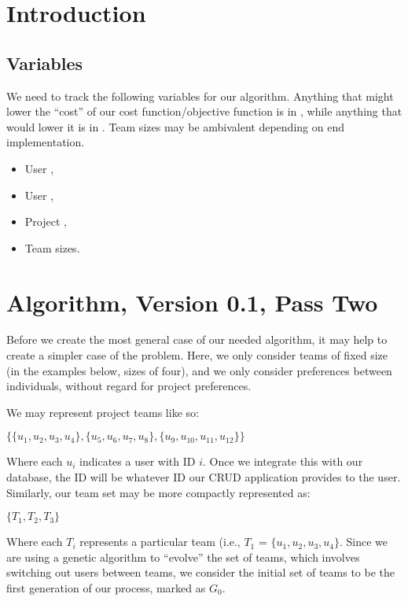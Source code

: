 \documentclass[11pt]{article}
\begin{document}
\section{Introduction}

\subsection{Variables}
We need to track the following variables for our algorithm. Anything that might lower the ``cost'' of our cost function/objective function is in {\color{red}{red}}, while anything that would lower it is in {\color{green}{green}}. Team sizes may be ambivalent depending on end implementation.
\begin{itemize}
	\item User {\color{red}{avoids}},
	\item User {\color{green}{prefers}},
	\item Project {\color{green}{preferences}},
	\item Team sizes.
\end{itemize}

\section{Algorithm, Version 0.1, Pass Two}
Before we create the most general case of our needed algorithm, it may help to create a simpler case of the problem. Here, we only consider teams of fixed size (in the examples below, sizes of four), and we only consider preferences between individuals, without regard for project preferences.

We may represent project teams like so:
\begin{center}
	$\{ \{ u_1, u_2, u_3, u_4 \}, \{ u_5, u_6, u_7, u_8 \}, \{ u_9, u_{10}, u_{11}, u_{12} \} \}$
\end{center}

Where each $u_i$ indicates a user with ID $i$. Once we integrate this with our database, the ID will be whatever ID our CRUD application provides to the user. Similarly, our team set may be more compactly represented as:

\begin{center}
$\{ T_1, T_2, T_3 \}$
\end{center}

Where each $T_i$ represents a particular team (i.e., $T_1$ = $\{ u_1, u_2, u_3, u_4 \}$. Since we are using a genetic algorithm to ``evolve'' the set of teams, which involves switching out users between teams, we consider the initial set of teams to be the first generation of our process, marked as $G_0$.
\end{document}
